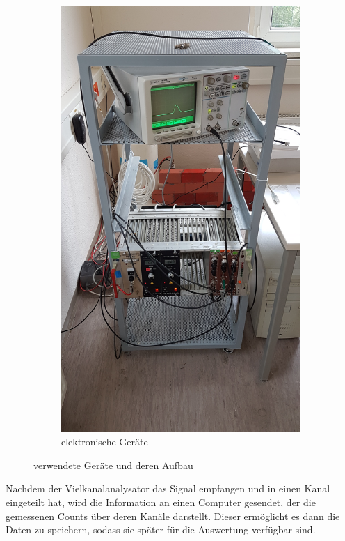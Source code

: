 \begin{figure}[htb]
\begin{subfigure}[b]{0.5\textwidth}
			\includegraphics[scale=0.1, angle=-90]{pic/20160613_152531.jpg}
			\caption{elektronische Geräte}
		\end{subfigure}
		\caption{verwendete Geräte und deren Aufbau}
		\label{fig:aufbau}
	\end{figure}

	Nachdem der Vielkanalanalysator das Signal empfangen und in einen Kanal eingeteilt hat, wird die Information an einen Computer gesendet, der die gemessenen Counts über deren Kanäle darstellt.
	Dieser ermöglicht es dann die Daten zu speichern, sodass sie später für die Auswertung verfügbar sind.

